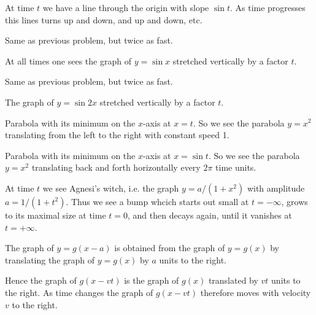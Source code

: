 \item[{\bfseries(III5.14a)}]

At time $t$ we have a line through the origin with slope $\sin t$.
As time progresses this lines turns up and down, and up and down,  etc.
\bigskip

\item[{\bfseries(III5.14b)}]

Same as previous problem, but twice as fast.
\bigskip

\item[{\bfseries(III5.14c)}]

At all times one sees the graph of $y=\sin x$ stretched vertically by a factor $t$.
\bigskip

\item[{\bfseries(III5.14d)}]

Same as previous problem, but twice as fast.
\bigskip

\item[{\bfseries(III5.14e)}]

The graph of $y=\sin 2x$ stretched vertically by a factor $t$.
\bigskip

\item[{\bfseries(III5.14f)}]

Parabola with its minimum on the $x$-axis at $x=t$.
So we see the parabola $y=x^2$ translating from the left to the right
with constant speed 1.
\bigskip

\item[{\bfseries(III5.14g)}]

Parabola with its minimum on the $x$-axis at $x=\sin t$.
So we see the parabola $y=x^2$ translating back and forth horizontally
every $2\pi$ time units.
\bigskip

\item[{\bfseries(III5.14j)}]

At time $t$ we see Agnesi's witch, i.e. the graph $y= a/(1+x^2)$
with amplitude $a=1/(1+t^2)$.  Thus we see a bump whcich starts out small
 at $t=-\infty$, grows to its maximal size at time $t=0$, and then decays
again, until it vanishes at $t=+\infty$.
\bigskip

\item[{\bfseries(III5.16)}]

The graph of $y=g(x-a)$ is obtained from the graph of $y=g(x)$ by
translating the graph of $y=g(x)$ by $a$ units to the right.

Hence the graph of $g(x-vt)$ is the graph of $g(x)$ translated by $vt$
units to the right.  As time changes the graph of $g(x-vt)$ therefore
moves with velocity $v$ to the right.
\bigskip

